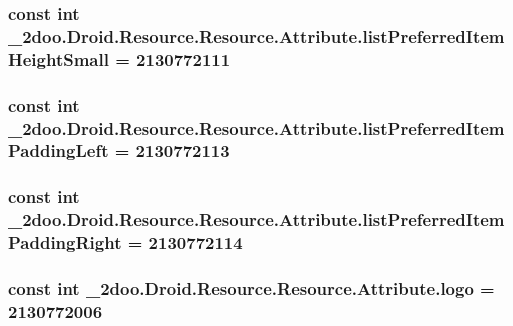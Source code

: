 \hypertarget{class__2doo_1_1_droid_1_1_resource_1_1_attribute_864d6ecc0d0cbfa97efdb32b448b4252}{
\subsubsection[{listPreferredItemHeightSmall}]{\setlength{\rightskip}{0pt plus 5cm}const int \_\-2doo.Droid.Resource.Resource.Attribute.listPreferredItemHeightSmall = 2130772111}}
\label{class__2doo_1_1_droid_1_1_resource_1_1_attribute_864d6ecc0d0cbfa97efdb32b448b4252}


\hypertarget{class__2doo_1_1_droid_1_1_resource_1_1_attribute_fa948f45a04322d8985dd10c8383d466}{
\subsubsection[{listPreferredItemPaddingLeft}]{\setlength{\rightskip}{0pt plus 5cm}const int \_\-2doo.Droid.Resource.Resource.Attribute.listPreferredItemPaddingLeft = 2130772113}}
\label{class__2doo_1_1_droid_1_1_resource_1_1_attribute_fa948f45a04322d8985dd10c8383d466}


\hypertarget{class__2doo_1_1_droid_1_1_resource_1_1_attribute_d97c4cf8989d5e17218ebd782e928fac}{
\subsubsection[{listPreferredItemPaddingRight}]{\setlength{\rightskip}{0pt plus 5cm}const int \_\-2doo.Droid.Resource.Resource.Attribute.listPreferredItemPaddingRight = 2130772114}}
\label{class__2doo_1_1_droid_1_1_resource_1_1_attribute_d97c4cf8989d5e17218ebd782e928fac}


\hypertarget{class__2doo_1_1_droid_1_1_resource_1_1_attribute_41e5bc0f19f4397091087bb1d9f67528}{
\subsubsection[{logo}]{\setlength{\rightskip}{0pt plus 5cm}const int \_\-2doo.Droid.Resource.Resource.Attribute.logo = 2130772006}}
\label{class__2doo_1_1_droid_1_1_resource_1_1_attribute_41e5bc0f19f4397091087bb1d9f67528}


